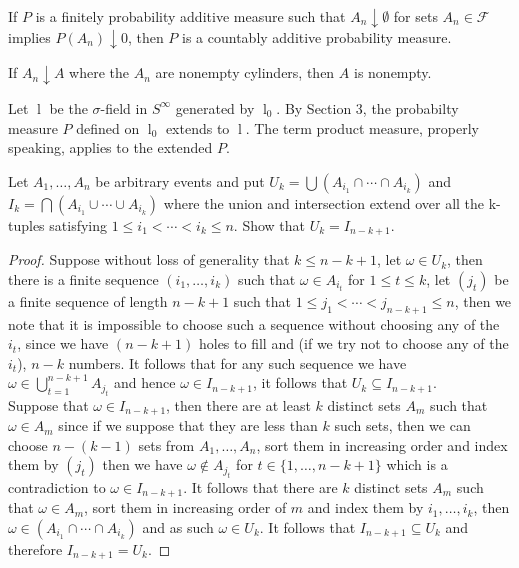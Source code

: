 \documentclass[12pt]{article}
\newcommand{\F}{\mathcal{F}}
\newcommand{\lc}{\mathop l}
\newcommand{\seq}{\subseteq}
\newcommand{\om}{\omega}
\newcommand{\es}{\emptyset}
\newcommand{\un}{\cup}
\newcommand{\ic}{\cap}
\newenvironment{rmrk}[2][Remark]{\begin{trivlist}
\item[\hskip \labelsep {\bfseries #1}\hskip \labelsep {\bfseries #2.}]}{\end{trivlist}}
\newenvironment{lemma}[2][Lemma]{\begin{trivlist}
\item[\hskip \labelsep {\bfseries #1}\hskip \labelsep {\bfseries #2.}]}{\end{trivlist}}
\newenvironment{exercise}[2][Exercise]{\begin{trivlist}
\item[\hskip \labelsep {\bfseries #1}\hskip \labelsep {\bfseries #2.}]}{\end{trivlist}}
\begin{document}
\begin{lemma}{18}
    If $P$ is a finitely probability additive measure such that $A_n \downarrow \es$ for sets $A_n \in \F$ implies $P(A_n) \downarrow 0$, then $P$ is a countably additive probability measure.
\end{lemma}

\begin{lemma}{19}
    If $A_n \downarrow A$ where the $A_n$ are nonempty cylinders, then $A$ is nonempty.
\end{lemma}

\begin{rmrk}{20}
    Let $\lc$ be the $\sigma$-field in $S^{\infty}$ generated by $\lc_0$. By Section 3, the probabilty measure $P$ defined on $\lc_0$ extends to $\lc$. The term product measure, properly speaking, applies to the extended $P$.
\end{rmrk}

\hrulefill

\begin{exercise}{2.2}
    Let $A_1, \ldots, A_n$ be arbitrary events and put $U_k = \bigcup \left ( A_{i_1} \ic \cdots \ic A_{i_k} \right )$ and $I_k = \bigcap \left ( A_{i_1} \un \cdots \un A_{i_k} \right )$ where the union and intersection extend over all the k-tuples satisfying $1 \leq i_1 < \cdots < i_k \leq n$. Show that $U_k = I_{n-k+1}$.
\end{exercise}
\begin{proof}
    Suppose without loss of generality that $k \leq n-k+1$, let $\om \in U_k$, then there is a finite sequence $(i_1, \ldots, i_k)$ such that $\om \in A_{i_t}$ for $1 \leq t \leq k$, let $(j_t)$ be a finite sequence of length $n-k+1$ such that $1 \leq j_1 < \cdots < j_{n-k+1} \leq n$, then we note that it is impossible to choose such a sequence without choosing any of the $i_t$, since we have $(n-k+1)$ holes to fill and (if we try not to choose any of the $i_t$), $n-k$ numbers. It follows that for any such sequence we have $\om \in \bigcup_{t=1}^{n-k+1} A_{j_t}$ and hence $\om \in I_{n-k+1}$, it follows that $U_k \seq I_{n-k+1}$. \\
    Suppose that $\om \in I_{n-k+1}$, then there are at least $k$ distinct sets $A_m$ such that $\om \in A_m$ since if we suppose that they are less than $k$ such sets, then we can choose $n-(k-1)$ sets from $A_1, \ldots, A_n$, sort them in increasing order and index them by $(j_t)$ then we have $\om \notin A_{j_t}$ for $t \in \{ 1, \ldots, n-k+1 \}$ which is a contradiction to $\om \in I_{n-k+1}$. It follows that there are $k$ distinct sets $A_m$ such that $\om \in A_m$, sort them in increasing order of $m$ and index them by $i_1, \ldots, i_{k}$, then $\om \in (A_{i_1} \ic \cdots \ic A_{i_k})$ and as such $\om \in U_k$. It follows that $I_{n-k+1} \seq U_k$ and therefore $I_{n-k+1} = U_k$.
\end{proof}
\end{document}
